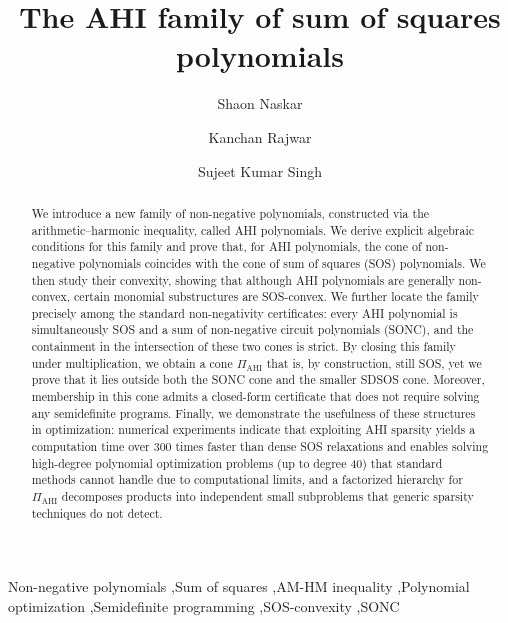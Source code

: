 \documentclass[12pt]{elsarticle}
\theoremstyle{definition}
\begin{document}
\begin{frontmatter}

\title{The AHI family of sum of squares polynomials}

\author[label1]{Shaon Naskar}

\author[label1]{Kanchan Rajwar}

\author[label1]{Sujeet Kumar Singh}


\address[label1]{Indian Statistical Institute, Hyderabad Unit, 500007, India}


\begin{abstract}
We introduce a new family of non-negative polynomials, constructed via the arithmetic--harmonic inequality, called AHI polynomials. We derive explicit algebraic conditions for this family and prove that, for AHI polynomials, the cone of non-negative polynomials coincides with the cone of sum of squares (SOS) polynomials. We then study their convexity, showing that although AHI polynomials are generally non-convex, certain monomial substructures are SOS-convex. We further locate the family precisely among the standard non-negativity certificates: every AHI polynomial is simultaneously SOS and a sum of non-negative circuit polynomials (SONC), and the containment in the intersection of these two cones is strict. By closing this family under multiplication, we obtain a cone $\Pi_{\mathrm{AHI}}$ that is, by construction, still SOS, yet we prove that it lies outside both the SONC cone and the smaller SDSOS cone. Moreover, membership in this cone admits a closed-form certificate that does not require solving any semidefinite programs. Finally, we demonstrate the usefulness of these structures in optimization: numerical experiments indicate that exploiting AHI sparsity yields a computation time over 300 times faster than dense SOS relaxations and enables solving high-degree polynomial optimization problems (up to degree 40) that standard methods cannot handle due to computational limits, and a factorized hierarchy for $\Pi_{\mathrm{AHI}}$ decomposes products into independent small subproblems that generic sparsity techniques do not detect.
\end{abstract}

\begin{keyword}
Non-negative polynomials \sep Sum of squares \sep AM-HM inequality \sep Polynomial optimization \sep Semidefinite programming \sep SOS-convexity \sep SONC
\end{keyword}

\end{frontmatter}
\makeatletter
\def\ps@pprintTitle{%
 \let\@oddhead\@empty
 \let\@evenhead\@empty
 \def\@oddfoot{}%
 \let\@evenfoot\@oddfoot}
\makeatother
\end{document}
